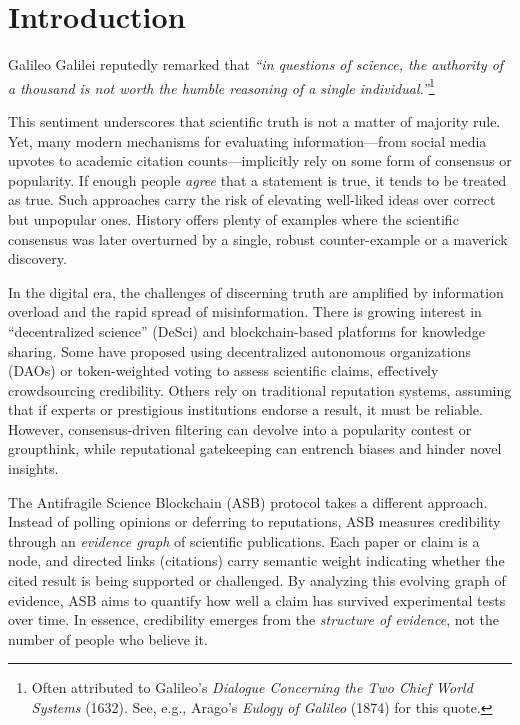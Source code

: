 \section{Introduction}

Galileo Galilei reputedly remarked that \emph{``in questions of science, the authority of a thousand is not worth the humble reasoning of a single individual.''}\footnote{Often attributed to Galileo's \emph{Dialogue Concerning the Two Chief World Systems} (1632). See, e.g., Arago's \emph{Eulogy of Galileo} (1874) for this quote.} 

This sentiment underscores that scientific truth is not a matter of majority rule. Yet, many modern mechanisms for evaluating information---from social media upvotes to academic citation counts---implicitly rely on some form of consensus or popularity. If enough people \emph{agree} that a statement is true, it tends to be treated as true. Such approaches carry the risk of elevating well-liked ideas over correct but unpopular ones. History offers plenty of examples where the scientific consensus was later overturned by a single, robust counter-example or a maverick discovery.

In the digital era, the challenges of discerning truth are amplified by information overload and the rapid spread of misinformation. There is growing interest in ``decentralized science'' (DeSci) and blockchain-based platforms for knowledge sharing. Some have proposed using decentralized autonomous organizations (DAOs) or token-weighted voting to assess scientific claims, effectively crowdsourcing credibility. Others rely on traditional reputation systems, assuming that if experts or prestigious institutions endorse a result, it must be reliable. However, consensus-driven filtering can devolve into a popularity contest or groupthink, while reputational gatekeeping can entrench biases and hinder novel insights.

The Antifragile Science Blockchain (ASB) protocol takes a different approach. Instead of polling opinions or deferring to reputations, ASB measures credibility through an \emph{evidence graph} of scientific publications. Each paper or claim is a node, and directed links (citations) carry semantic weight indicating whether the cited result is being supported or challenged. By analyzing this evolving graph of evidence, ASB aims to quantify how well a claim has survived experimental tests over time. In essence, credibility emerges from the \emph{structure of evidence}, not the number of people who believe it.

